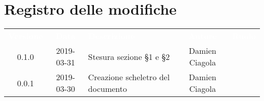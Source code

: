\section*{Registro delle modifiche}
{
	\renewcommand{\arraystretch}{1.5}
	\centering
	\begin{longtable}{ c c C{6cm} c c }
		\textcolor{white}{\textbf{Versione}} & \textcolor{white}{\textbf{Data}} & \textcolor{white}{\textbf{Descrizione}} & \textcolor{white}{\textbf{Autore}} & \textcolor{white}{\textbf{Ruolo}}\\
		
		0.1.0 & 
		2019-03-31 &  
		Stesura sezione §1 e §2 &	
		Damien Ciagola &
		\reda{}  \\
		
		0.0.1 & 
		2019-03-30 &  
		Creazione scheletro del documento&	
		Damien Ciagola  &	
		\reda{}  \\
	\end{longtable}

}